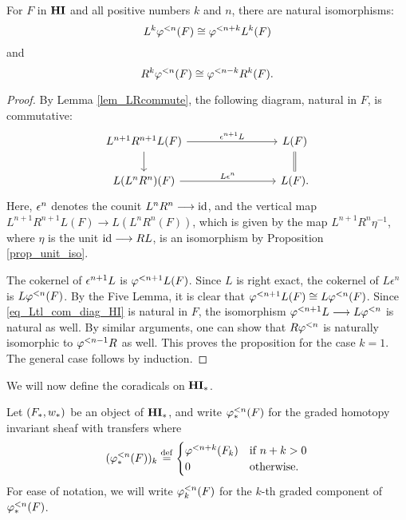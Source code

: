 \begin{prop}\label{prop_tl_L_R}
For $F$ in $\HI$ and all positive numbers $k$ and $n$, there are 
natural isomorphisms:
\begin{equation}\label{eq_prop_tl_L_eq}
L^k \tlHI{n}(F) \cong \tlHI{n + k} L^k(F)
\end{equation}
and
\begin{equation}\label{eq_prop_tl_R_eq}
R^k \tlHI{n}(F) \cong \tlHI{n - k}R^k(F).
\end{equation}
\end{prop}
\begin{proof}
By Lemma \ref{lem_LRcommute}, the following diagram, natural in $F$, 
is commutative:
\begin{equation}\label{eq_Ltl_com_diag_HI}
\begin{tikzcd}[column sep=80pt]
L^{n + 1}R^{n + 1}L(F) \arrow{r}{\cuHI^{n + 1}L} \arrow{d} &
L(F) \arrow[equals]{d} \\
L(L^{n}R^n)(F) \arrow{r}{L\cuHI^{n}} &
L(F).
\end{tikzcd}
\end{equation}
Here, $\cuHI^n$ denotes the counit $L^nR^n \to \id$,
and the vertical map $L^{n + 1}R^{n + 1}L(F) \to L(L^nR^n (F))$, which is 
given by the map $L^{n + 1}R^n \eta^{-1}$, where $\eta$ is
the unit $\id \to RL$, is an isomorphism by Proposition 
\ref{prop_unit_iso}.

The cokernel of $\cuHI^{n + 1}L$ is $\tlHI{n + 1}L(F)$. Since $L$ 
is right exact, the cokernel of $L\epsilon^n$ is $L\tlHI{n}(F)$. 
By the Five Lemma, it is clear that $\tlHI{n + 1}L(F) \cong 
L\tlHI{n}(F)$. Since \eqref{eq_Ltl_com_diag_HI} is natural in $F$,
the isomorphism $\tlHI{n + 1}L \to L\tlHI{n}$ is natural as well.
By similar arguments, one can show that $R\tlHI{n}$ is naturally
isomorphic to $\tlHI{n - 1}R$ as well. This proves the proposition
for the case $k = 1$. The general case follows by induction.
\end{proof}

We will now define the coradicals on $\HM$. 

\begin{defn}\label{def_corad_HM}
Let $(F_*, \deloop_*)$ 
be an object of $\HM$, and write $\tlHM{n}(F)$ for the graded 
homotopy invariant sheaf with transfers where
\[
(\tlHM{n}(F))_k \defeq
\begin{cases}
   \tlHI{n + k}(F_k) & \textrm{if } n + k > 0 \\
   0                 & \textrm{otherwise}.
\end{cases}
\]
For ease of notation, we will write $\tlHM[k]{n}(F)$ for the 
$k$-th graded component of $\tlHM{n}(F)$.
\end{defn}

